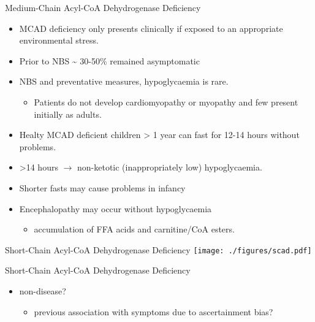 \documentclass[presentation, smaller]{beamer}
\begin{document}
\begin{frame}[label={sec:orgheadline26}]{Medium-Chain Acyl-CoA Dehydrogenase Deficiency}
\begin{itemize}
\item MCAD deficiency only presents clinically if exposed to an
appropriate environmental stress.
\item Prior to NBS \textasciitilde{} 30-50\% remained asymptomatic
\item NBS and preventative measures, hypoglycaemia is rare.
\begin{itemize}
\item Patients do not develop cardiomyopathy or myopathy and few present
initially as adults.
\end{itemize}
\item Healty MCAD deficient children > 1 year can fast for 12-14 hours without problems.
\item >14 hours \(\to\) non-ketotic (inappropriately low) hypoglycaemia.
\item Shorter fasts may cause problems in infancy
\item Encephalopathy may occur without hypoglycaemia
\begin{itemize}
\item accumulation of FFA acids and carnitine/CoA esters.
\end{itemize}
\end{itemize}
\end{frame}

\begin{frame}[label={sec:orgheadline27}]{Short-Chain Acyl-CoA Dehydrogenase Deficiency}
\texttt{[image: ./figures/scad.pdf]}
\end{frame}
\begin{frame}[label={sec:orgheadline28}]{Short-Chain Acyl-CoA Dehydrogenase Deficiency}
\begin{itemize}
\item non-disease?
\begin{itemize}
\item previous association with symptoms due to ascertainment bias?
\end{itemize}
\end{itemize}
\end{frame}
\end{document}
